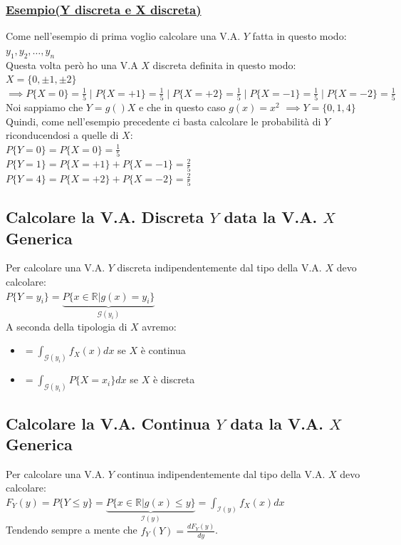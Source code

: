 \documentclass{article}
\begin{document}
\subsubsection{\underline{Esempio(Y discreta e X discreta)}}
Come nell’esempio di prima voglio calcolare una V.A. $Y$ fatta in questo modo: $y_1,y_2, \dots , y_n$ \\
Questa volta però ho una V.A $X$ discreta definita in questo modo: $X = \big\{0, \pm 1 , \pm 2 \big\} $ \\
$\implies P\big\{X = 0\big\} = \frac 15 \;\big|\;  P\big\{X = +1\big\} = \frac 15 \;\big|\;  P\big\{X = +2\big\} = \frac 15 \;\big|\;  P\big\{X = -1\big\} = \frac 15 \;\big|\;  P\big\{X = -2\big\} = \frac 15$ \\
Noi sappiamo che $Y=g()X$ e che in questo caso $g(x) = x^2$ $\implies Y = \big\{0,1,4\big\}$ \\
Quindi, come nell’esempio precedente ci basta calcolare le probabilità di $Y$ riconducendosi a quelle di $X$: \\
$P \big\{Y = 0 \big\} = P \big\{X = 0 \big\} = \frac 15 $ \\
$P \big\{Y = 1 \big\} = P \big\{X = +1 \big\} + P \big\{X = -1 \big\} = \frac 25 $ \\
$P \big\{Y = 4 \big\} = P \big\{X = +2 \big\} + P \big\{X = -2 \big\} = \frac 25 $

\subsection{Calcolare la V.A. Discreta $Y$ data la V.A. $X$ Generica}
Per calcolare una V.A. $Y$ discreta indipendentemente dal tipo della V.A. $X$ devo calcolare: \\
$P\big\{ Y=y_i\big\} = \underset{\mathcal{G}(y_i)}{\underbrace{P \big\{ x \in \mathbb{R} \big| g(x) = y_i \big\}}}$ \\
A seconda della tipologia di $X$ avremo:
\begin{itemize}
    \item $= \int_{\mathcal{G}(y_i)} f_X(x) dx$ se $X$ è continua
    \item $= \int_{\mathcal{G}(y_i)} P \big\{ X=x_i\big\}dx$ se $X$ è discreta
\end{itemize}

\subsection{Calcolare la V.A. Continua $Y$ data la V.A. $X$ Generica}
Per calcolare una V.A. $Y$ continua indipendentemente dal tipo della V.A. $X$ devo calcolare: \\
$F_Y(y) = P \big\{ Y \leq y \big\} = \underset{\mathcal{I}(y)}{\underbrace{P \big\{ x \in \mathbb{R} \big| g(x) \leq y \big\}}} = \int_{\mathcal{I}(y)} f_X(x) dx$ \\
Tendendo sempre a mente che $f_Y(Y) = \frac{dF_Y(y)}{dy}$.
\end{document}
